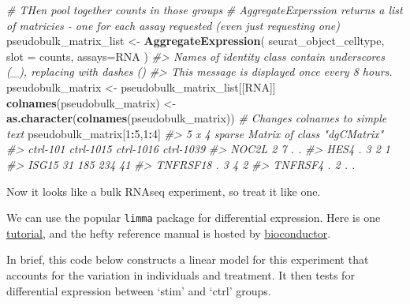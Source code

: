 \documentclass[
]{book}
\newenvironment{Shaded}{\begin{snugshade}}{\end{snugshade}}
\newcommand{\AttributeTok}[1]{\textcolor[rgb]{0.13,0.29,0.53}{#1}}
\newcommand{\CommentTok}[1]{\textcolor[rgb]{0.56,0.35,0.01}{\textit{#1}}}
\newcommand{\DecValTok}[1]{\textcolor[rgb]{0.00,0.00,0.81}{#1}}
\newcommand{\FunctionTok}[1]{\textcolor[rgb]{0.13,0.29,0.53}{\textbf{#1}}}
\newcommand{\NormalTok}[1]{#1}
\newcommand{\OtherTok}[1]{\textcolor[rgb]{0.56,0.35,0.01}{#1}}
\newcommand{\SpecialCharTok}[1]{\textcolor[rgb]{0.81,0.36,0.00}{\textbf{#1}}}
\newcommand{\StringTok}[1]{\textcolor[rgb]{0.31,0.60,0.02}{#1}}
\begin{document}
\begin{Shaded}
\begin{Highlighting}[]
\CommentTok{\# THen pool together counts in those groups}
\CommentTok{\# AggregateExperssion returns a list of matricies {-} one for each assay requested (even just requesting one)}
\NormalTok{pseudobulk\_matrix\_list }\OtherTok{\textless{}{-}} \FunctionTok{AggregateExpression}\NormalTok{( seurat\_object\_celltype,  }\AttributeTok{slot =} \StringTok{\textquotesingle{}counts\textquotesingle{}}\NormalTok{, }\AttributeTok{assays=}\StringTok{\textquotesingle{}RNA\textquotesingle{}}\NormalTok{ )}
\CommentTok{\#\textgreater{} Names of identity class contain underscores (\textquotesingle{}\_\textquotesingle{}), replacing with dashes (\textquotesingle{}{-}\textquotesingle{})}
\CommentTok{\#\textgreater{} This message is displayed once every 8 hours.}
\NormalTok{pseudobulk\_matrix      }\OtherTok{\textless{}{-}}\NormalTok{ pseudobulk\_matrix\_list[[}\StringTok{\textquotesingle{}RNA\textquotesingle{}}\NormalTok{]]}
\FunctionTok{colnames}\NormalTok{(pseudobulk\_matrix) }\OtherTok{\textless{}{-}} \FunctionTok{as.character}\NormalTok{(}\FunctionTok{colnames}\NormalTok{(pseudobulk\_matrix)) }\CommentTok{\# Changes colnames to simple text}
\NormalTok{pseudobulk\_matrix[}\DecValTok{1}\SpecialCharTok{:}\DecValTok{5}\NormalTok{,}\DecValTok{1}\SpecialCharTok{:}\DecValTok{4}\NormalTok{]}
\CommentTok{\#\textgreater{} 5 x 4 sparse Matrix of class "dgCMatrix"}
\CommentTok{\#\textgreater{}          ctrl{-}101 ctrl{-}1015 ctrl{-}1016 ctrl{-}1039}
\CommentTok{\#\textgreater{} NOC2L           2         7         .         .}
\CommentTok{\#\textgreater{} HES4            .         3         2         1}
\CommentTok{\#\textgreater{} ISG15          31       185       234        41}
\CommentTok{\#\textgreater{} TNFRSF18        .         3         4         2}
\CommentTok{\#\textgreater{} TNFRSF4         .         2         .         .}
\end{Highlighting}
\end{Shaded}

Now it looks like a bulk RNAseq experiment, so treat it like one.

We can use the popular \texttt{limma} package for differential expression. Here is one \href{https://ucdavis-bioinformatics-training.github.io/2018-June-RNA-Seq-Workshop/thursday/DE.html}{tutorial}, and the hefty reference manual is hosted by \href{https://bioconductor.org/packages/release/bioc/html/limma.html}{bioconductor}.

In brief, this code below constructs a linear model for this experiment that accounts for the variation in individuals and treatment. It then tests for differential expression between `stim' and `ctrl' groups.
\end{document}
